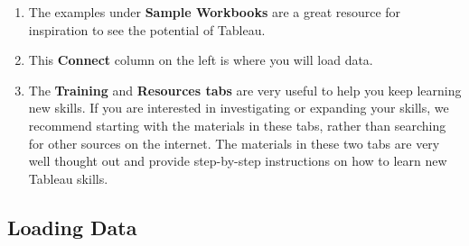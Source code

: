 \documentclass[
]{book}
\providecommand{\tightlist}{%
  \setlength{\itemsep}{0pt}\setlength{\parskip}{0pt}}
\begin{document}
\begin{enumerate}
\def\labelenumi{(\alph{enumi})}
\tightlist
\item
  The examples under \textbf{Sample Workbooks} are a great resource for inspiration to see the potential of Tableau.
\item
  This \textbf{Connect} column on the left is where you will load data.
\item
  The \textbf{Training} and \textbf{Resources tabs} are very useful to help you keep learning new skills. If you are interested in investigating or expanding your skills, we recommend starting with the materials in these tabs, rather than searching for other sources on the internet. The materials in these two tabs are very well thought out and provide step-by-step instructions on how to learn new Tableau skills.
\end{enumerate}

\hypertarget{loading-data}{%
\subsection{Loading Data}\label{loading-data}}
\end{document}
